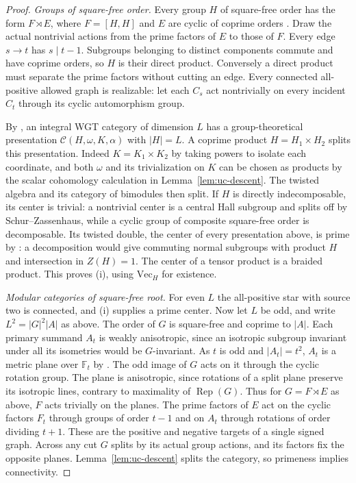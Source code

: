 \documentclass[11pt,a4paper]{article}
\numberwithin{equation}{section}
\theoremstyle{remark}
\renewcommand{\Vec}{\mathrm{Vec}}
\newcommand{\Rep}{\operatorname{Rep}}
\begin{document}
\begin{proof}
\emph{Groups of square-free order.}
Every group $H$ of square-free order has the form $F\rtimes E$,
where $F=[H,H]$ and $E$ are cyclic of coprime orders
\cite[Theorem~10.1.10]{Robinson}. Draw the actual nontrivial actions
from the prime factors of $E$ to those of $F$. Every edge
$s\to t$ has $s\mid t-1$. Subgroups belonging to distinct
components commute and have coprime orders, so $H$ is their
direct product. Conversely a direct product must separate the
prime factors without cutting an edge. Every connected all-positive
allowed graph is realizable: let each $C_s$ act nontrivially on
every incident $C_t$ through its cyclic automorphism group.

By \cite[Proposition~9.1]{ENOsolvable}, an integral WGT category
of dimension $L$ has a group-theoretical presentation
$\mathcal C(H,\omega,K,\alpha)$ with $|H|=L$. A coprime product
$H=H_1\times H_2$ splits this presentation. Indeed
$K=K_1\times K_2$ by taking powers to isolate each coordinate,
and both $\omega$ and its trivialization on $K$ can be chosen as
products by the scalar cohomology calculation in
Lemma~\ref{lem:uc-descent}. The twisted algebra and its category
of bimodules then split. If $H$ is directly indecomposable, its
center is trivial: a nontrivial center is a central Hall subgroup
and splits off by Schur--Zassenhaus, while a cyclic group of
composite square-free order is decomposable. Its twisted double,
the center of every presentation above, is prime by
\cite[Proposition~6.7(ii), p.~4215]{NNW}: a decomposition would give commuting
normal subgroups with product $H$ and intersection in $Z(H)=1$.
The center of a tensor product is a braided product. This proves
(i), using $\Vec_H$ for existence.

\emph{Modular categories of square-free root.}
For even $L$ the all-positive star with source two is connected,
and (i) supplies a prime center. Now let $L$ be odd, and write
$L^2=|G|^2|A|$ as above. The order of $G$ is square-free and
coprime to $|A|$. Each primary summand $A_t$ is weakly anisotropic, since an isotropic
subgroup invariant under all its isometries would be $G$-invariant.
As $t$ is odd and $|A_t|=t^2$, $A_t$ is a metric plane over
$\mathbb F_t$ by \cite[Theorem~A.24(i),(iv)]{DGNO}. The odd image of $G$ acts on it
through the cyclic rotation group. The plane is anisotropic, since
rotations of a split plane preserve its isotropic lines, contrary
to maximality of $\Rep(G)$. Thus for $G=F\rtimes E$ as above,
$F$ acts trivially on the planes. The prime factors of $E$ act on
the cyclic factors $F_t$ through groups of order $t-1$ and on
$A_t$ through rotations of order dividing $t+1$. These are the
positive and negative targets of a single signed graph.
Across any cut $G$ splits by its actual group actions, and its
factors fix the opposite planes. Lemma~\ref{lem:uc-descent} splits
the category, so primeness implies connectivity.


\end{proof}
\end{document}
